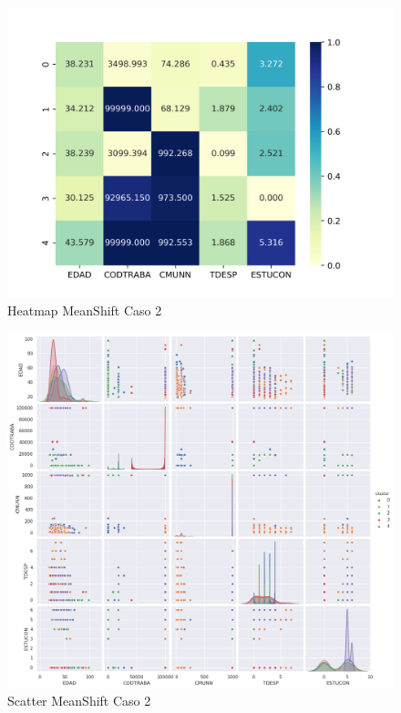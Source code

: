\begin{figure}[H] %
	\centering
	\includegraphics[scale=0.8]{heatmap-ms2.png}  %
	\caption{Heatmap MeanShift Caso 2} 
	\label{fig:hm-ms-caso2}
\end{figure}

\begin{figure}[H] %
	\centering
	\includegraphics[scale=0.4]{meanshift2.png}  %
	\caption{Scatter MeanShift Caso 2} 
	\label{fig:sc-ms-caso2}
\end{figure}

